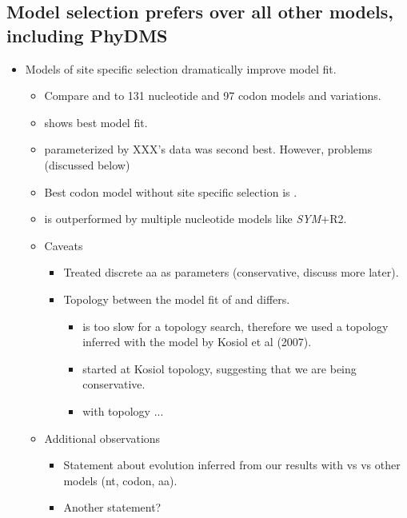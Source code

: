 \documentclass[12pt]{article}
\begin{document}
\subsection*{Model selection prefers \selac over all other models, including PhyDMS}
\begin{itemize}
\item Models of site specific selection dramatically improve model fit.
  \begin{itemize}
  \item Compare \selac and \phydms to 131 nucleotide and 97 codon models and variations.
  \item \selac shows best model fit.
  \item \phydms parameterized by XXX's data was second best.
    However, problems (discussed below)
  \item Best codon model without site specific selection is \gy.
  \item \gy is outperformed by multiple nucleotide models like \emph{SYM}+R2.
  \item Caveats
    \begin{itemize}
    \item Treated discrete aa as parameters (conservative, discuss more later).
    \item Topology between the model fit of \phydms and \selac differs.
      \begin{itemize}
      \item \selac is too slow for a topology search, therefore we used a topology inferred with the model by Kosiol et al (2007).
      \item \phydms started at Kosiol topology, suggesting that we are being conservative.
      \item \selac with \phydms topology ...        
      \end{itemize}
    \end{itemize}
  \item Additional observations
    \begin{itemize}
    \item Statement about evolution inferred from our results with \selac vs \phydms vs other models (nt, codon, aa).
    \item Another statement?
  \end{itemize}
\end{itemize}


\end{itemize}
\end{document}
